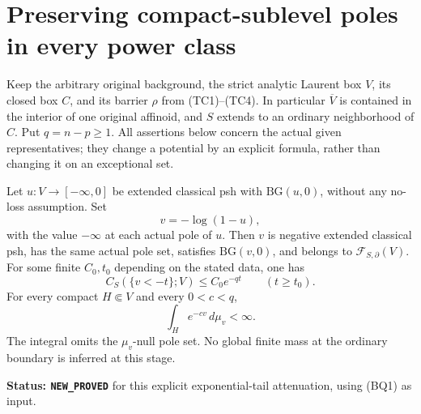 \section{Preserving compact-sublevel poles in every power class}
\label{sec:r11-logarithmic-pole-representatives}

Keep the arbitrary original background, the strict analytic
Laurent box $V$, its closed box $C$, and its barrier $\rho$
from (TC1)--(TC4). In particular $\overline V$ is contained
in the interior of one original affinoid, and $S$ extends to
an ordinary neighborhood of $C$. Put $q=n-p\geq1$.
All assertions below concern the actual given representatives;
they change a potential by an explicit formula, rather than
changing it on an exceptional set.

\begin{lemma}
\label{lem:r11-logarithmic-attenuation}
Let $u:V\to[-\infty,0]$ be extended classical psh with
$\mathrm{BG}(u,0)$, without any no-loss assumption. Set
\[
                         v=-\log(1-u),
 \tag{LP1}
\]
with the value $-\infty$ at each actual pole of $u$.
Then $v$ is negative extended classical psh, has the same
actual pole set, satisfies $\mathrm{BG}(v,0)$, and belongs
to $\mathcal F_{S,\partial}(V)$. For some finite $C_0,t_0$
depending on the stated data, one has
\[
               C_S(\{v<-t\};V)\leq C_0e^{-qt}
                                     \qquad(t\geq t_0).
 \tag{LP2}
\]
For every compact $H\Subset V$ and every $0<c<q$,
\[
                \int_H e^{-cv}\,d\mu_v<\infty.
 \tag{LP3}
\]
The integral omits the $\mu_v$-null pole set. No global
finite mass at the ordinary boundary is inferred at this stage.
\end{lemma}

\noindent\textbf{Status: \texttt{NEW\_PROVED}} for this
explicit exponential-tail attenuation, using (BQ1) as input.

